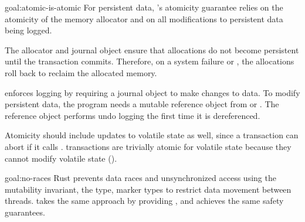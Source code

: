 \begin{goaltrue}{goal:atomic-is-atomic}
  For persistent data, \This{}'s atomicity guarantee relies on the atomicity of
  the memory allocator and on all modifications to persistent data being
  logged.

  The allocator and journal object ensure that allocations do not become
  persistent until the transaction commits.  Therefore, on a system failure or
  , the allocations roll back to reclaim the allocated memory.  
  
  \This{} enforces logging by requiring a journal object to make changes to
  data.  To modify persistent data, the program needs a mutable reference
  object from  or .  The
  reference object performs undo logging the first time it is dereferenced.


  Atomicity should include updates to volatile state as well, since
  a transaction can abort if it calls .  \This{} transactions are
  trivially atomic for volatile state because they cannot modify volatile state
  ().

\end{goaltrue}

\begin{goaltrue}{goal:no-races}
  Rust prevents data races and unsynchronized access using the mutability
  invariant, the  type, marker types to restrict data movement between threads.
  \This{} takes the same approach by providing , and achieves the
  same safety guarantees.
  
\end{goaltrue}

